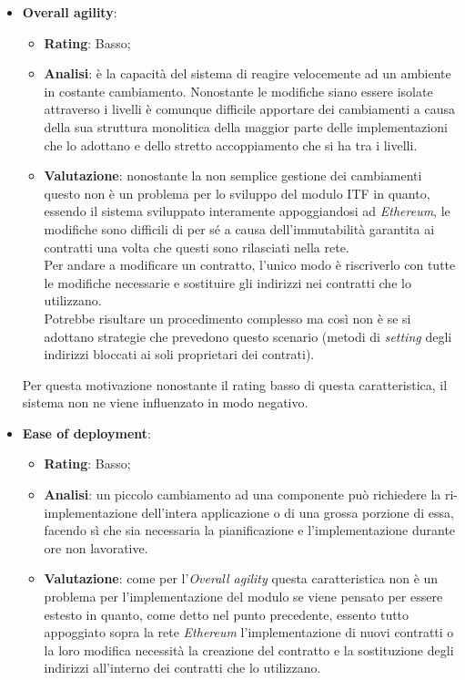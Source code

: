 \begin{itemize}
	\item \textbf{Overall agility}:
	\begin{itemize}
		\item \textbf{Rating}: Basso;
		\item \textbf{Analisi}: è la capacità del sistema di reagire velocemente ad un ambiente in costante cambiamento. Nonostante le modifiche siano essere isolate attraverso i livelli è comunque difficile apportare dei cambiamenti a causa della sua struttura monolitica della maggior parte delle implementazioni che lo adottano e dello stretto accoppiamento che si ha tra i livelli\cite{3tierArch}\cite{3tierArch2}.
		\item \textbf{Valutazione}: nonostante la non semplice gestione dei cambiamenti questo non è un problema per lo sviluppo del modulo \gls{ITF} in quanto, essendo il sistema sviluppato interamente appoggiandosi ad \textit{Ethereum}, le modifiche sono difficili di per sé a causa dell'immutabilità garantita ai contratti una volta che questi sono rilasciati nella rete.\\
		Per andare a modificare un contratto, l'unico modo è riscriverlo con tutte le modifiche necessarie e sostituire gli indirizzi nei contratti che lo utilizzano.\\
		Potrebbe risultare un procedimento complesso ma così non è se si adottano strategie che prevedono questo scenario (metodi di \textit{setting} degli indirizzi bloccati ai soli proprietari dei contrati).\\
	\end{itemize}
	Per questa motivazione nonostante il rating basso di questa caratteristica, il sistema non ne viene influenzato in modo negativo.
	\item \textbf{Ease of deployment}:
	\begin{itemize}
		\item \textbf{Rating}: Basso;
		\item \textbf{Analisi}: un piccolo cambiamento ad una componente può richiedere la ri-implementazione dell'intera applicazione o di una grossa porzione di essa, facendo sì che sia necessaria la pianificazione e l'implementazione durante ore non lavorative\cite{3tierArch}\cite{3tierArch2}.
		\item \textbf{Valutazione}: come per l'\textit{Overall agility} questa caratteristica non è un problema per l'implementazione del modulo se viene pensato per essere estesto in quanto, come detto nel punto precedente, essento tutto appoggiato sopra la rete \textit{Ethereum} l'implementazione di nuovi contratti o la loro modifica necessità la creazione del contratto e la sostituzione degli indirizzi all'interno dei contratti che lo utilizzano.

\end{itemize}
\end{itemize}
